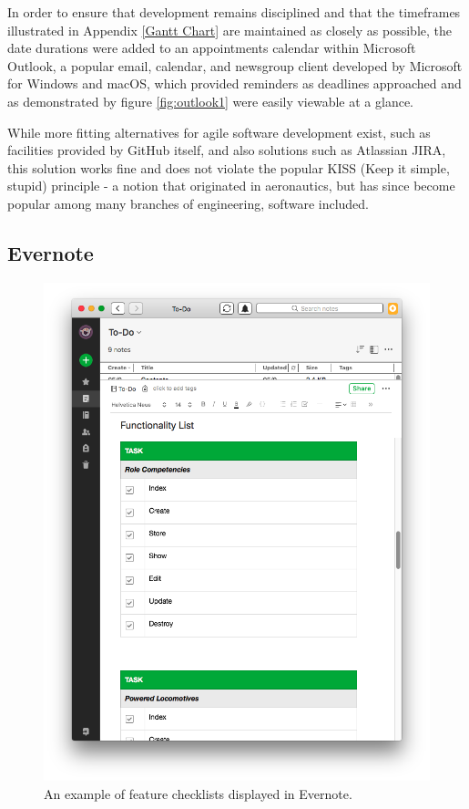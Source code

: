 In order to ensure that development remains disciplined and that the timeframes illustrated in Appendix \ref{Gantt Chart} are maintained as closely as possible, the date durations were added to an appointments calendar within Microsoft Outlook, a popular email, calendar, and newsgroup client developed by Microsoft for Windows and macOS, \cite{Microsoft1} which provided reminders as deadlines approached and as demonstrated by figure \ref{fig:outlook1} were easily viewable at a glance.

While more fitting alternatives for agile software development exist, such as facilities provided by GitHub itself, and also solutions such as Atlassian JIRA, this solution works fine and does not violate the popular KISS (Keep it simple, stupid) principle - a notion that originated in aeronautics, but has since become popular among many branches of engineering, software included. \cite{Branson1}

\subsection{Evernote}
\begin{figure}[h]
    \includegraphics[width=\textwidth]{Figures/evernote}
    \caption{An example of feature checklists displayed in Evernote.}
    \label{fig:evernote1}
\end{figure}

